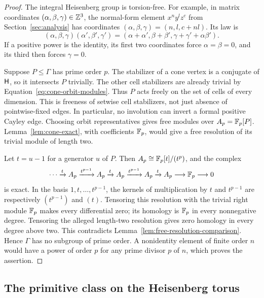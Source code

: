 \begin{proof}
The integral Heisenberg group is torsion-free.  For example, in
matrix coordinates $(\alpha,\beta,\gamma)\in\mathbb Z^3$, the normal-form
element $x^n y^l z^c$ from Section~\ref{sec:analysis} has coordinates
$(\alpha,\beta,\gamma)=(n,l,c+nl)$.  Its law is
\begin{equation}
 (\alpha,\beta,\gamma)(\alpha',\beta',\gamma')
 = (\alpha+\alpha',\beta+\beta',
       \gamma+\gamma'+\alpha\beta').
 \label{eq:heisenberg-coordinates}
\end{equation}
If a positive power is the identity, its first two coordinates
force $\alpha=\beta=0$, and its third then forces $\gamma=0$.

Suppose $P\leq\Gamma$ has prime order $p$.  The stabilizer of a
cone vertex is a conjugate of $\mathsf H$, so it intersects $P$
trivially.  The other cell stabilizers are already trivial by
Equation~\eqref{eq:cone-orbit-modules}.  Thus $P$ acts freely on
the set of cells of every dimension.  This is freeness of setwise
cell stabilizers, not just absence of pointwise-fixed edges.  In
particular, no involution can invert a formal positive Cayley edge.
Choosing orbit representatives gives free modules over
$A_p=\mathbb F_p[P]$.  Lemma~\ref{lem:cone-exact}, with coefficients
$\mathbb F_p$, would give a free resolution of its trivial module of
length two.

Let $t=u-1$ for a generator $u$ of $P$.  Then
$A_p\cong\mathbb F_p[t]/(t^p)$, and the complex
\begin{equation}
 \cdots\xrightarrow{t}A_p\xrightarrow{t^{p-1}}A_p
 \xrightarrow{t}A_p\xrightarrow{t^{p-1}}A_p
 \xrightarrow{t}A_p\longrightarrow\mathbb F_p\longrightarrow0
 \label{eq:cyclic-periodic-resolution}
\end{equation}
is exact.  In the basis $1,t,\ldots,t^{p-1}$, the kernels of
multiplication by $t$ and $t^{p-1}$ are respectively
$(t^{p-1})$ and $(t)$.  Tensoring this resolution with the trivial
right module $\mathbb F_p$ makes every differential zero; its homology
is $\mathbb F_p$ in every nonnegative degree.  Tensoring the alleged
length-two resolution gives zero homology in every degree above
two.  This contradicts Lemma~\ref{lem:free-resolution-comparison}.
Hence $\Gamma$ has no subgroup of prime order.  A nonidentity
element of finite order $n$ would have a power of order $p$ for
any prime divisor $p$ of $n$, which proves the assertion.
\end{proof}

\subsection{The primitive class on the Heisenberg torus}

